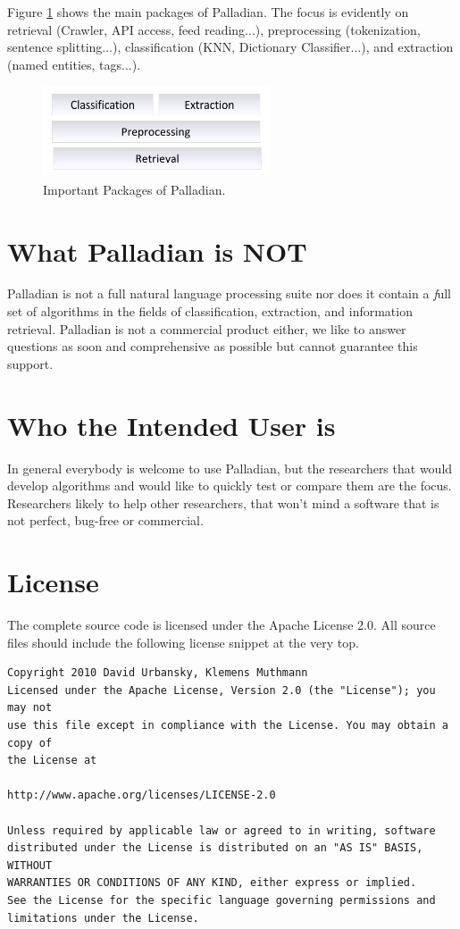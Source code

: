 \documentclass[a4paper,twoside]{book}      %
\begin{document}
Figure \ref{fig:architecture} shows the main packages of Palladian. The focus is evidently on retrieval (Crawler, API access, feed reading...), preprocessing (tokenization, sentence splitting...), classification (KNN, Dictionary Classifier...), and extraction (named entities, tags...).

\begin{figure}[ht!]
\centering
\includegraphics[width=0.6\textwidth]{img/architecture.pdf}
\caption{Important Packages of Palladian.}
\label{fig:architecture}
\end{figure}

\section{What Palladian is NOT}
Palladian is not a full natural language processing suite nor does it contain a {\textit full} set of algorithms in the fields of classification, extraction, and information retrieval. Palladian is not a commercial product either, we like to answer questions as soon and comprehensive as possible but cannot guarantee this support.

\section{Who the Intended User is}
In general everybody is welcome to use Palladian, but the researchers that would develop algorithms and would like to quickly test or compare them are the focus. Researchers likely to help other researchers, that won't mind a software that is not perfect, bug-free or commercial.

\section{License}
The complete source code is licensed under the Apache License 2.0. All source files should include the following license snippet at the very top.

\begin{verbatim}
Copyright 2010 David Urbansky, Klemens Muthmann
Licensed under the Apache License, Version 2.0 (the "License"); you may not
use this file except in compliance with the License. You may obtain a copy of
the License at

http://www.apache.org/licenses/LICENSE-2.0

Unless required by applicable law or agreed to in writing, software
distributed under the License is distributed on an "AS IS" BASIS, WITHOUT
WARRANTIES OR CONDITIONS OF ANY KIND, either express or implied.
See the License for the specific language governing permissions and
limitations under the License.
\end{verbatim}
\end{document}
